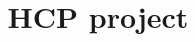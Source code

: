 \documentclass[preprint,12pt]{elsarticle}
\begin{document}
	
	\begin{frontmatter}
		
		
		
		\title{\textbf{HCP project}}
		
		


\end{frontmatter}



 




\clearpage


%







\end{document}
